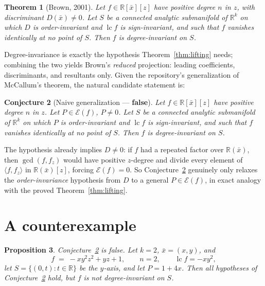 \documentclass[11pt,a4paper]{article}
\newtheorem{theorem}{Theorem}[section]
\newtheorem{proposition}[theorem]{Proposition}
\newtheorem{conjecture}[theorem]{Conjecture}
\theoremstyle{definition}
\newcommand{\R}{\mathbb{R}}
\newcommand{\xb}{\bar{x}}
\newcommand{\lc}{\operatorname{lc}}
\newcommand{\E}{\mathcal{E}}
\newcommand{\ideal}[1]{\langle #1\rangle}
\begin{document}
\begin{theorem}[Brown, 2001]\label{thm:brown}
Let $f \in \R[\xb][z]$ have positive degree $n$ in $z$, with discriminant
$D(\xb) \neq 0$. Let $S$ be a connected analytic submanifold of $\R^k$ on which
$D$ is order-invariant and $\lc f$ is sign-invariant, and such that $f$
vanishes identically at no point of $S$. Then $f$ is degree-invariant on $S$.
\end{theorem}

Degree-invariance is exactly the hypothesis Theorem~\ref{thm:lifting} needs;
combining the two yields Brown's \emph{reduced} projection: leading
coefficients, discriminants, and resultants only. Given the repository's
generalization of McCallum's theorem, the natural candidate statement is:

\begin{conjecture}[Naive generalization --- \textbf{false}]\label{conj:naive}
Let $f \in \R[\xb][z]$ have positive degree $n$ in $z$. Let $P \in \E(f)$,
$P \neq 0$. Let $S$ be a connected analytic submanifold of $\R^k$ on which $P$
is order-invariant and $\lc f$ is sign-invariant, and such that $f$ vanishes
identically at no point of $S$. Then $f$ is degree-invariant on $S$.
\end{conjecture}

The hypothesis already implies $D \neq 0$: if $f$ had a repeated factor over
$\R(\xb)$, then $\gcd(f,f_z)$ would have positive $z$-degree and divide every
element of $\ideal{f,f_z}$ in $\R(\xb)[z]$, forcing $\E(f) = 0$. So
Conjecture~\ref{conj:naive} genuinely only relaxes the \emph{order-invariance}
hypothesis from $D$ to a general $P\in\E(f)$, in exact analogy with the proved
Theorem~\ref{thm:lifting}.

\section{A counterexample}\label{sec:counterexample}

\begin{proposition}\label{prop:counterexample}
Conjecture~\ref{conj:naive} is false. Let $k = 2$, $\xb = (x,y)$, and
\[
  f \;=\; -x y^2 z^2 + y z + 1, \qquad n = 2, \qquad \lc f = -xy^2 ,
\]
let $S = \{(0,t) : t \in \R\}$ be the $y$-axis, and let $P = 1 + 4x$. Then all
hypotheses of Conjecture~\ref{conj:naive} hold, but $f$ is not degree-invariant
on $S$.
\end{proposition}
\end{document}
